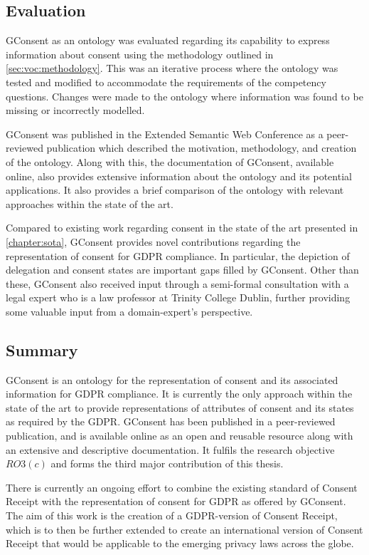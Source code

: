 \subsection{Evaluation}
GConsent as an ontology was evaluated regarding its capability to express information about consent using the methodology outlined in \autoref{sec:voc:methodology}.
This was an iterative process where the ontology was tested and modified to accommodate the requirements of the competency questions. Changes were made to the ontology where information was found to be missing or incorrectly modelled.

GConsent was published in the Extended Semantic Web Conference as a peer-reviewed publication \cite{} which described the motivation, methodology, and creation of the ontology. Along with this, the documentation of GConsent, available online, also provides extensive information about the ontology and its potential applications. It also provides a brief comparison of the ontology with relevant approaches within the state of the art.

Compared to existing work regarding consent in the state of the art presented in \autoref{chapter:sota}, GConsent provides novel contributions regarding the representation of consent for GDPR compliance.
In particular, the depiction of delegation and consent states are important gaps filled by GConsent.
Other than these, GConsent also received input through a semi-formal consultation with a legal expert who is a law professor at Trinity College Dublin, further providing some valuable input from a domain-expert's perspective.

\subsection*{Summary}
GConsent is an ontology for the representation of consent and its associated information for GDPR compliance.
It is currently the only approach within the state of the art to provide representations of attributes of consent and its states as required by the GDPR.
GConsent has been published in a peer-reviewed publication, and is available online as an open and reusable resource along with an extensive and descriptive documentation.
It fulfils the research objective $RO3(c)$ and forms the third major contribution of this thesis.

There is currently an ongoing effort to combine the existing standard of Consent Receipt \cite{} with the representation of consent for GDPR as offered by GConsent. The aim of this work is the creation of a GDPR-version of Consent Receipt, which is to then be further extended to create an international version of Consent Receipt that would be applicable to the emerging privacy laws across the globe. 

